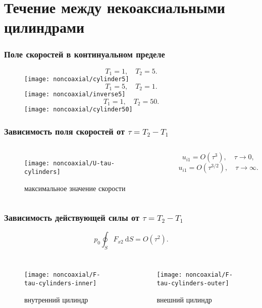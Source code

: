 \documentclass[mathserif]{beamer} %
\newcommand{\dd}{\:\mathrm{d}}
\newcommand{\OO}[1]{O(#1)}
\begin{document}
\section{Течение между некоаксиальными цилиндрами}

\begin{frame}
    \frametitle{Поле скоростей в континуальном пределе}
    \centering
    \begin{figure}
    \begin{overprint}
            \[ T_1 = 1, \quad T_2 = 5.\]
            \hspace{-1cm}
            \texttt{[image: noncoaxial/cylinder5]}
            \[ T_1 = 5, \quad T_2 = 1.\]
            \hspace{-1cm}
            \texttt{[image: noncoaxial/inverse5]}
            \[ T_1 = 1, \quad T_2 = 50.\]
            \hspace{-1cm}
            \texttt{[image: noncoaxial/cylinder50]}
    \end{overprint}
    \hspace{-.5cm}
    \end{figure}
\end{frame}

\begin{frame}
    \frametitle{Зависимость поля скоростей от \(\tau = T_2-T_1\)}
    \centering
    \begin{columns}
        \begin{figure}
            \texttt{[image: noncoaxial/U-tau-cylinders]}
            \vspace{-.5cm}\caption{максимальное значение скорости}
        \end{figure}
        \[ u_{i1} = \OO{\tau^3}, \quad \tau\to0, \]
        \[ u_{i1} = \OO{\tau^{3/2}}, \quad \tau\to\infty. \]
    \end{columns}
\end{frame}

\begin{frame}
    \frametitle{Зависимость действующей силы от \(\tau = T_2-T_1\)}
    \vspace{-.2cm}
    \[ p_0 \oint_S F_{x2}\dd{S} = \OO{\tau^2}. \]
    \vspace{-.7cm}
    \begin{columns}
        \begin{figure}
            \texttt{[image: noncoaxial/F-tau-cylinders-inner]}
            \vspace{-.5cm}\caption{внутренний цилиндр}
        \end{figure}
        \begin{figure}
            \texttt{[image: noncoaxial/F-tau-cylinders-outer]}
            \vspace{-.5cm}\caption{внешний цилиндр}
        \end{figure}
    \end{columns}
\end{frame}
\end{document}

